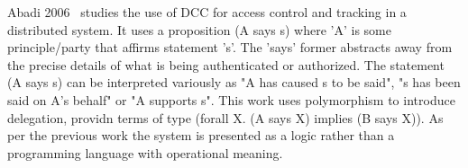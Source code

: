 Abadi 2006~\cite{Abadi2007:AccessControl} studies the use of DCC for access control and tracking in a distributed system. It uses a proposition (A says s) where 'A' is some principle/party that affirms statement 's'. The 'says' former abstracts away from the precise details of what is being authenticated or authorized. The statement (A says s) can be interpreted variously as "A has caused s to be said", "s has been said on A's behalf" or "A supports s". This work uses polymorphism to introduce delegation, providn terms of type (forall X. (A says X) implies (B says X)). As per the previous work \cite{Abadi1999:DCC} the system is presented as a logic rather than a programming language with operational meaning.



